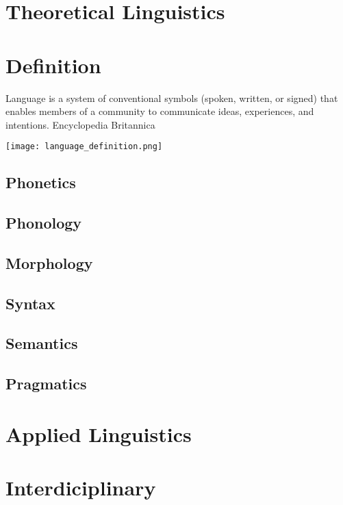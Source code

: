\section{Theoretical Linguistics}
    
    
\section{Definition}
    Language is a system of conventional symbols (spoken, written, or signed) that enables members of a community to communicate ideas, experiences, and intentions.
    Encyclopedia Britannica
    
    \texttt{[image: language\_definition.png]}
    
    
    \subsection{Phonetics}
    
    
    \subsection{Phonology}
    
    
    \subsection{Morphology}
    
    
    \subsection{Syntax}
    
    
    \subsection{Semantics}
    
    
    \subsection{Pragmatics}


\section{Applied Linguistics}


\section{Interdiciplinary}
    
